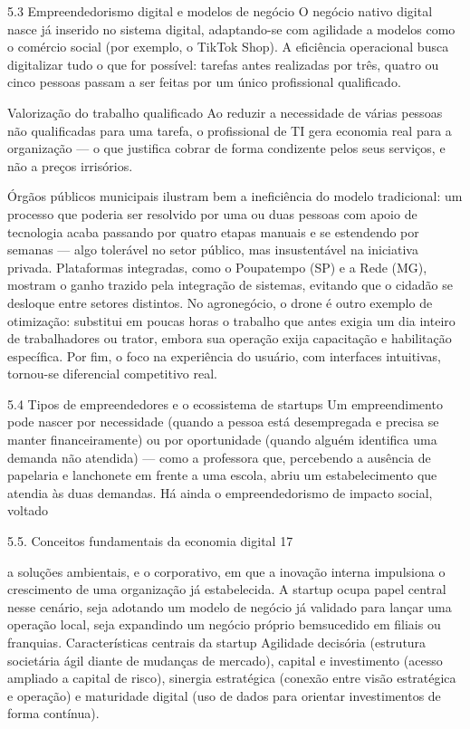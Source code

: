 5.3 Empreendedorismo digital e modelos de negócio O negócio nativo digital nasce já inserido no sistema digital, adaptando-se com agilidade a modelos como o comércio social (por exemplo, o TikTok Shop). A eficiência operacional busca digitalizar tudo o que for possível: tarefas antes realizadas por três, quatro ou cinco pessoas passam a ser feitas por um único profissional qualificado.

Valorização do trabalho qualificado Ao reduzir a necessidade de várias pessoas não qualificadas para uma tarefa, o profissional de TI gera economia real para a organização — o que justifica cobrar de forma condizente pelos seus serviços, e não a preços irrisórios.

Órgãos públicos municipais ilustram bem a ineficiência do modelo tradicional: um processo que poderia ser resolvido por uma ou duas pessoas com apoio de tecnologia acaba passando por quatro etapas manuais e se estendendo por semanas — algo tolerável no setor público, mas insustentável na iniciativa privada. Plataformas integradas, como o Poupatempo (SP) e a Rede (MG), mostram o ganho trazido pela integração de sistemas, evitando que o cidadão se desloque entre setores distintos. No agronegócio, o drone é outro exemplo de otimização: substitui em poucas horas o trabalho que antes exigia um dia inteiro de trabalhadores ou trator, embora sua operação exija capacitação e habilitação específica. Por fim, o foco na experiência do usuário, com interfaces intuitivas, tornou-se diferencial competitivo real.

5.4 Tipos de empreendedores e o ecossistema de startups Um empreendimento pode nascer por necessidade (quando a pessoa está desempregada e precisa se manter financeiramente) ou por oportunidade (quando alguém identifica uma demanda não atendida) — como a professora que, percebendo a ausência de papelaria e lanchonete em frente a uma escola, abriu um estabelecimento que atendia às duas demandas. Há ainda o empreendedorismo de impacto social, voltado

5.5. Conceitos fundamentais da economia digital 17

a soluções ambientais, e o corporativo, em que a inovação interna impulsiona o crescimento de uma organização já estabelecida. A startup ocupa papel central nesse cenário, seja adotando um modelo de negócio já validado para lançar uma operação local, seja expandindo um negócio próprio bemsucedido em filiais ou franquias. Características centrais da startup Agilidade decisória (estrutura societária ágil diante de mudanças de mercado), capital e investimento (acesso ampliado a capital de risco), sinergia estratégica (conexão entre visão estratégica e operação) e maturidade digital (uso de dados para orientar investimentos de forma contínua).

